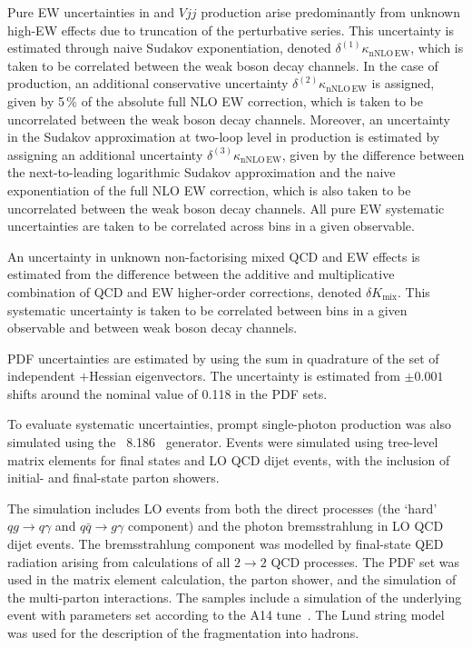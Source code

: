 \documentclass[atlasdraft=false, cernpreprint, UKenglish, texmf, orcidlogo]{atlasdoc}
\begin{document}
Pure EW uncertainties in \vjets and $Vjj$ production arise predominantly from
unknown high-\pT EW effects due to truncation of the perturbative series.
This uncertainty is estimated through naive Sudakov exponentiation,
denoted $\delta^{(1)}\kappa_\mathrm{nNLO\,EW}$, which is taken to be correlated between
the weak boson decay channels.
In the case of \vjets production, an additional conservative uncertainty
$\delta^{(2)}\kappa_\mathrm{nNLO\,EW}$ is assigned, given by 5\,\% of the absolute
full NLO EW correction, which is taken to be uncorrelated between the weak boson decay channels.
Moreover, an uncertainty in the Sudakov approximation at two-loop level in \vjets production is estimated by assigning
an additional uncertainty $\delta^{(3)}\kappa_\mathrm{nNLO\,EW}$, given by the difference between
the next-to-leading logarithmic Sudakov approximation and the naive exponentiation of the full
NLO EW correction, which is also taken to be uncorrelated between the weak boson decay channels.
All pure EW systematic uncertainties are taken to be correlated across bins in a given observable.
 
An uncertainty in unknown non-factorising mixed QCD and EW effects is estimated
from the difference between the additive and multiplicative combination of QCD and
EW higher-order corrections, denoted $\delta K_\mathrm{mix}$.
This systematic uncertainty is taken to be correlated between bins in a given observable
and between weak boson decay channels.
 
PDF uncertainties are estimated by using the sum in quadrature of the set of independent
\PDFforLHC$+$\LUXQED Hessian eigenvectors. The \alphas uncertainty is estimated from
$\pm0.001$ shifts around the nominal value of 0.118 in the PDF sets.
 
To evaluate systematic uncertainties, prompt single-photon production was also simulated
using the \PYTHIA~8.186~\cite{Sjostrand:2007gs} generator.
Events were simulated using tree-level matrix elements for \onegjet final
states and LO QCD dijet events, with the inclusion of initial-
and final-state parton showers.
 
The \PYTHIA simulation includes LO \onegjet events from both
the direct processes (the `hard' $qg \to q\gamma$ and $q\bar{q}\to g\gamma$ component)
and the photon bremsstrahlung in LO QCD dijet events.
The bremsstrahlung component was modelled by final-state QED radiation arising from calculations
of all $2 \to 2$ QCD processes. The \NNPDF[2.3lo] PDF
set was used in the matrix element calculation, the parton shower, and
the simulation of the multi-parton interactions. The samples
include a simulation of the underlying event with parameters set
according to the A14 tune~\cite{ATL-PHYS-PUB-2014-021}. The Lund
string model~\cite{Andersson:1983ia,Sjostrand:1984ic} was used for the
description of the fragmentation into hadrons.
 
\end{document}
